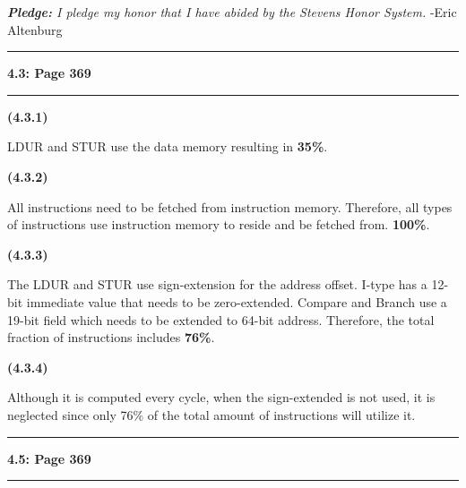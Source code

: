 \documentclass[11pt]{article}
\newcommand\question[2]{\vspace{.25in}\hrule\textbf{#1: #2}\vspace{.5em}\hrule\vspace{.10in}}
\renewcommand\part[1]{\vspace{.10in}\textbf{(#1)}\par}
\begin{document}
\raggedright
\newcommand\NAME{Eric Altenburg}  %
\newcommand\COURSE{CS-383}
\newcommand\HWNUM{3}              %


\textit{\textbf{Pledge:} I pledge my honor that I have abided by the Stevens Honor System.} -Eric Altenburg

\question{4.3}{Page 369}
	\part{4.3.1}
		LDUR and STUR use the data memory resulting in \textbf{35\%}.\par
		
	\part{4.3.2}
		All instructions need to be fetched from instruction memory. Therefore, all types of instructions use instruction memory to reside and be fetched from. \textbf{100\%}.\par
		
	\part{4.3.3}
		The LDUR and STUR use sign-extension for the address offset. I-type has a 12-bit immediate value that needs to be zero-extended. Compare and Branch use a 19-bit field which needs to be extended to 64-bit address. Therefore, the total fraction of instructions includes \textbf{76\%}.\par
		
	\part{4.3.4}
		Although it is computed every cycle, when the sign-extended is not used, it is neglected since only 76\% of the total amount of instructions will utilize it.\par
		
		
\question{4.5}{Page 369}
	
\end{document}
